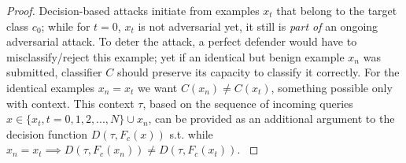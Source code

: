 \begin{proof}
Decision-based attacks initiate from examples $x_t$ that belong to the target class $c_0$; while for $t=0$, $x_t$ is not adversarial yet, it still is \textit{part of} an ongoing adversarial attack.
To deter the attack, a perfect defender would have to misclassify/reject this example; yet if an identical but benign example $x_n$ was submitted, classifier $C$ should preserve its capacity to classify it correctly.
For the identical examples $x_n = x_t$ we want $C(x_n) \neq C(x_t)$, something possible only with context.
This context $\tau$, based on the sequence of incoming queries  $x \in \{x_t, t = 0,1,2,...,N\} \cup x_n$, can be provided as an additional argument to the decision function $D(\tau, F_c(x))$ s.t. while $x_n = x_t \implies D(\tau, F_c(x_n)) \neq D(\tau, F_c(x_t)) $.
\label{prf:one}
\end{proof}


